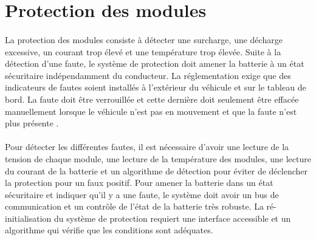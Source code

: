 \section{Protection des modules}
	\paragraph*{}
	La protection des modules consiste à détecter une surcharge, une décharge excessive, un courant trop élevé et une température trop élevée. Suite à la détection d'une faute, le système de protection doit amener la batterie à un état sécuritaire indépendamment du conducteur. La réglementation exige que des indicateurs de fautes soient installés à l'extérieur du véhicule et sur le tableau de bord. La faute doit être verrouillée et cette dernière doit seulement être effacée manuellement lorsque le véhicule n'est pas en mouvement et que la faute n'est plus présente \cite{cahier_charge}.
	
	\paragraph*{}
	Pour détecter les différentes fautes, il est nécessaire d'avoir une lecture de la tension de chaque module, une lecture de la température des modules, une lecture du courant de la batterie et un algorithme de détection pour éviter de déclencher la protection pour un faux positif. Pour amener la batterie dans un état sécuritaire et indiquer qu'il y a une faute, le système doit avoir un bus de communication et un contrôle de l'état de la batterie très robuste. La ré-initialisation du système de protection requiert une interface accessible et un algorithme qui vérifie que les conditions sont adéquates. 
	


	
